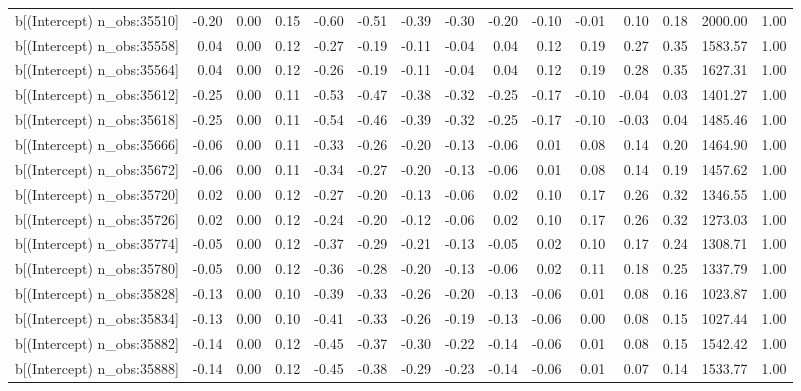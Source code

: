 \begin{table}[ht]
\begin{tabular}{rrrrrrrrrrrrrrr}
  b[(Intercept) n\_obs:35510] & -0.20 & 0.00 & 0.15 & -0.60 & -0.51 & -0.39 & -0.30 & -0.20 & -0.10 & -0.01 & 0.10 & 0.18 & 2000.00 & 1.00 \\ 
  b[(Intercept) n\_obs:35558] & 0.04 & 0.00 & 0.12 & -0.27 & -0.19 & -0.11 & -0.04 & 0.04 & 0.12 & 0.19 & 0.27 & 0.35 & 1583.57 & 1.00 \\ 
  b[(Intercept) n\_obs:35564] & 0.04 & 0.00 & 0.12 & -0.26 & -0.19 & -0.11 & -0.04 & 0.04 & 0.12 & 0.19 & 0.28 & 0.35 & 1627.31 & 1.00 \\ 
  b[(Intercept) n\_obs:35612] & -0.25 & 0.00 & 0.11 & -0.53 & -0.47 & -0.38 & -0.32 & -0.25 & -0.17 & -0.10 & -0.04 & 0.03 & 1401.27 & 1.00 \\ 
  b[(Intercept) n\_obs:35618] & -0.25 & 0.00 & 0.11 & -0.54 & -0.46 & -0.39 & -0.32 & -0.25 & -0.17 & -0.10 & -0.03 & 0.04 & 1485.46 & 1.00 \\ 
  b[(Intercept) n\_obs:35666] & -0.06 & 0.00 & 0.11 & -0.33 & -0.26 & -0.20 & -0.13 & -0.06 & 0.01 & 0.08 & 0.14 & 0.20 & 1464.90 & 1.00 \\ 
  b[(Intercept) n\_obs:35672] & -0.06 & 0.00 & 0.11 & -0.34 & -0.27 & -0.20 & -0.13 & -0.06 & 0.01 & 0.08 & 0.14 & 0.19 & 1457.62 & 1.00 \\ 
  b[(Intercept) n\_obs:35720] & 0.02 & 0.00 & 0.12 & -0.27 & -0.20 & -0.13 & -0.06 & 0.02 & 0.10 & 0.17 & 0.26 & 0.32 & 1346.55 & 1.00 \\ 
  b[(Intercept) n\_obs:35726] & 0.02 & 0.00 & 0.12 & -0.24 & -0.20 & -0.12 & -0.06 & 0.02 & 0.10 & 0.17 & 0.26 & 0.32 & 1273.03 & 1.00 \\ 
  b[(Intercept) n\_obs:35774] & -0.05 & 0.00 & 0.12 & -0.37 & -0.29 & -0.21 & -0.13 & -0.05 & 0.02 & 0.10 & 0.17 & 0.24 & 1308.71 & 1.00 \\ 
  b[(Intercept) n\_obs:35780] & -0.05 & 0.00 & 0.12 & -0.36 & -0.28 & -0.20 & -0.13 & -0.06 & 0.02 & 0.11 & 0.18 & 0.25 & 1337.79 & 1.00 \\ 
  b[(Intercept) n\_obs:35828] & -0.13 & 0.00 & 0.10 & -0.39 & -0.33 & -0.26 & -0.20 & -0.13 & -0.06 & 0.01 & 0.08 & 0.16 & 1023.87 & 1.00 \\ 
  b[(Intercept) n\_obs:35834] & -0.13 & 0.00 & 0.10 & -0.41 & -0.33 & -0.26 & -0.19 & -0.13 & -0.06 & 0.00 & 0.08 & 0.15 & 1027.44 & 1.00 \\ 
  b[(Intercept) n\_obs:35882] & -0.14 & 0.00 & 0.12 & -0.45 & -0.37 & -0.30 & -0.22 & -0.14 & -0.06 & 0.01 & 0.08 & 0.15 & 1542.42 & 1.00 \\ 
  b[(Intercept) n\_obs:35888] & -0.14 & 0.00 & 0.12 & -0.45 & -0.38 & -0.29 & -0.23 & -0.14 & -0.06 & 0.01 & 0.07 & 0.14 & 1533.77 & 1.00 \\ 

\end{tabular}
\end{table}
